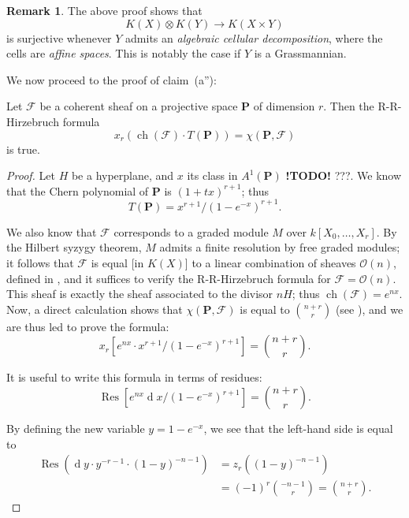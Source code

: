 \documentclass{article}
\theoremstyle{plain}
\newenvironment{proposition}[1]
    {\renewcommand\theinnercustomproposition{#1}\innercustomproposition}
    {\endinnercustomproposition}
\theoremstyle{definition}
\newtheorem*{remark}{Remark}
\newcommand{\sh}{\mathscr}
\newcommand{\PP}{\mathbf{P}}
\newcommand{\dd}{\operatorname{d}\!}
\DeclareMathOperator{\ch}{ch}
\newcommand{\todo}{\textbf{ !TODO! }}
\newcommand{\oldpage}[1]{\marginpar{\footnotesize$\Big\vert$ \textit{p.~#1}}}
\begin{document}
\begin{remark}
  The above proof shows that
  \[
    K(X)\otimes K(Y) \to K(X\times Y)
  \]
  is surjective whenever $Y$ admits an \emph{algebraic cellular decomposition}, where the cells are \emph{affine spaces}.
  This is notably the case if $Y$ is a Grassmannian.
\end{remark}

We now proceed to the proof of claim~(a''):

\begin{proposition}{10}
\label{proposition10}
  Let $\sh{F}$ be a coherent sheaf on a projective space $\PP$
\oldpage{119}
  of dimension $r$.
  Then the R-R-Hirzebruch formula
  \[
    x_r(\ch(\sh{F})\cdot T(\PP)) = \chi(\PP,\sh{F})
  \]
  is true.
\end{proposition}

\begin{proof}
  Let $H$ be a hyperplane, and $x$ its class in $A^1(\PP)$ \todo???.
  We know that the Chern polynomial of $\PP$ is $(1+tx)^{r+1}$;
  thus
  \[
    T(\PP) = x^{r+1}/(1-e^{-x})^{r+1}.
  \]

  We also know that $\sh{F}$ corresponds to a graded module $M$ over $k[X_0,\ldots,X_r]$.
  By the Hilbert syzygy theorem, $M$ admits a finite resolution by free graded modules;
  it follows that $\sh{F}$ is equal [in $K(X)$] to a linear combination of sheaves $\sh{O}(n)$, defined in \cite[p.~246]{12}, and it suffices to verify the R-R-Hirzebruch formula for $\sh{F}=\sh{O}(n)$.
  This sheaf is exactly the sheaf associated to the divisor $nH$;
  thus $\ch(\sh{F})=e^{nx}$.
  Now, a direct calculation shows that $\chi(\PP,\sh{F})$ is equal to $\binom{n+r}{r}$ (see \cite[p.~275]{12}), and we are thus led to prove the formula:
  \[
  \label{10equation*}
    x_r[e^{nx}\cdot x^{r+1}/(1-e^{-x})^{r+1}] = \binom{n+r}{r}.
    \tag{$\star$}
  \]

  It is useful to write this formula in terms of residues:
  \[
  \label{10equation**}
    \operatorname{Res}[e^{nx}\dd x/(1-e^{-x})^{r+1}] = \binom{n+r}{r}.
    \tag{$\star\star$}
  \]

  By defining the new variable $y=1-e^{-x}$, we see that the left-hand side is equal to
  \begin{align*}
    \operatorname{Res}(\dd y\cdot y^{-r-1}\cdot(1-y)^{-n-1})
    &= z_r((1-y)^{-n-1})
  \\&= (-1)^r\binom{-n-1}{r}
    = \binom{n+r}{r}.
  \end{align*}
\end{proof}
\end{document}
